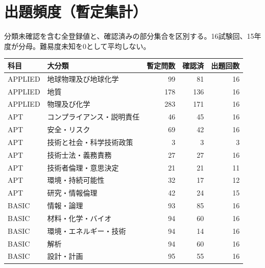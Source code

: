 \chapter{出題頻度（暫定集計）}
分類未確認を含む全登録値と、確認済みの部分集合を区別する。16試験回、15年度が分母。難易度未知を0として平均しない。
\begin{longtable}{p{.16\linewidth}p{.42\linewidth}rrr}
科目 & 大分類 & 暫定問数 & 確認済 & 出題回数\\\hline
APPLIED & 地球物理及び地球化学 & 99 & 81 & 16\\
APPLIED & 地質 & 178 & 136 & 16\\
APPLIED & 物理及び化学 & 283 & 171 & 16\\
APT & コンプライアンス・説明責任 & 46 & 45 & 16\\
APT & 安全・リスク & 69 & 42 & 16\\
APT & 技術と社会・科学技術政策 & 3 & 3 & 3\\
APT & 技術士法・義務責務 & 27 & 27 & 16\\
APT & 技術者倫理・意思決定 & 21 & 21 & 11\\
APT & 環境・持続可能性 & 32 & 17 & 12\\
APT & 研究・情報倫理 & 42 & 24 & 15\\
BASIC & 情報・論理 & 93 & 85 & 16\\
BASIC & 材料・化学・バイオ & 94 & 60 & 16\\
BASIC & 環境・エネルギー・技術 & 94 & 14 & 16\\
BASIC & 解析 & 94 & 60 & 16\\
BASIC & 設計・計画 & 95 & 55 & 16\\
\end{longtable}
